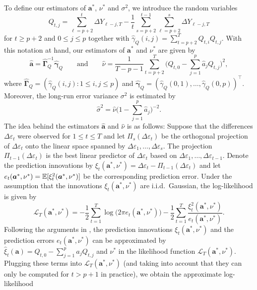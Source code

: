 To define our estimators of $\boldsymbol{a}^*$, $\nu^*$ and $\sigma^2$, we introduce the random variables
\[ Q_{t,j} = \sum\limits_{\ell=p+2}^t \Delta Y_{\ell-j,T} - \frac{1}{t} \sum\limits_{s=p+2}^{t-1} \sum\limits_{\ell=p+2}^s \Delta Y_{\ell-j,T} \]
for $t \ge p + 2$ and $0 \le j \le p$ together with $\widehat{\gamma}_Q(i,j) = \sum_{t=p+2}^T Q_{t,i} Q_{t,j}$. With this notation at hand, our estimators of $\boldsymbol{a}^*$ and $\nu^*$ are given by 
\begin{equation}\label{def-est-AR-parameters}
\widehat{\boldsymbol{a}} = \widehat{\boldsymbol{\Gamma}}_Q^{-1} \widehat{\boldsymbol{\gamma}}_Q \qquad \text{and} \qquad \widehat{\nu} = \frac{1}{T-p-1} \sum\limits_{t=p+2}^T \Big( Q_{t,0} - \sum\limits_{j=1}^p \widehat{a}_j Q_{t,j} \Big)^2, 
\end{equation}
where $\widehat{\boldsymbol{\Gamma}}_Q = (\widehat{\gamma}_Q(i,j): 1 \le i,j \le p)$ and $\widehat{\boldsymbol{\gamma}}_Q = (\widehat{\gamma}_Q(0,1),\ldots,\widehat{\gamma}_Q(0,p))^\top$. Moreover, the long-run error variance $\sigma^2$ is estimated by  
\begin{equation}\label{def-est-LRV}
\widehat{\sigma}^2 = \widehat{\nu} \Big( 1-\sum_{j=1}^p \widehat{a}_j \Big)^{-2}.
\end{equation}
The idea behind the estimators $\widehat{\boldsymbol{a}}$ and $\widehat{\nu}$ is as follows: Suppose that the differences $\Delta \varepsilon_t$ were observed for $1 \le t \le T$ and let $\Pi_s (\Delta \varepsilon_t)$ be the orthogonal projection of $\Delta \varepsilon_t$ onto the linear space spanned by $\Delta \varepsilon_1,\ldots,\Delta \varepsilon_s$. The projection $\Pi_{t-1} (\Delta \varepsilon_t)$ is the best linear predictor of $\Delta \varepsilon_t$ based on $\Delta \varepsilon_1,\ldots,\Delta \varepsilon_{t-1}$. Denote the prediction innovations by $\xi_t(\boldsymbol{a}^*,\nu^*) = \Delta \varepsilon_t - \Pi_{t-1} (\Delta \varepsilon_t)$ and let $e_t(\boldsymbol{a}^*,\nu^*) = \mathbb{E}[ \xi_t^2(\boldsymbol{a}^*,\nu^*)]$ be the corresponding prediction error. Under the assumption that the innovations $\xi_t(\boldsymbol{a}^*,\nu^*)$ are i.i.d.\ Gaussian, the log-likelihood is given by  
\[ \mathcal{L}_T(\boldsymbol{a}^*,\nu^*) = -\frac{1}{2} \sum\limits_{t=1}^T \log \big(2 \pi e_t(\boldsymbol{a}^*,\nu^*)\big) - \frac{1}{2} \sum\limits_{t=1}^T \frac{\xi_t^2(\boldsymbol{a}^*,\nu^*)}{e_t(\boldsymbol{a}^*,\nu^*)}. \]
Following the arguments in \cite{PhamDinh1978}, the prediction innovations $\xi_t(\boldsymbol{a}^*,\nu^*)$ and the prediction errors $e_t(\boldsymbol{a}^*,\nu^*)$ can be approximated by $\widehat{\xi}_t(\boldsymbol{a}) = Q_{t,0} - \sum_{j=1}^p a_j Q_{t,j}$ and $\nu^*$ in the likelihood function $\mathcal{L}_T(\boldsymbol{a}^*,\nu^*)$. Plugging these terms into $\mathcal{L}_T(\boldsymbol{a}^*,\nu^*)$ (and taking into account that they can only be computed for $t > p+1$ in practice), we obtain the approximate log-likelihood 
